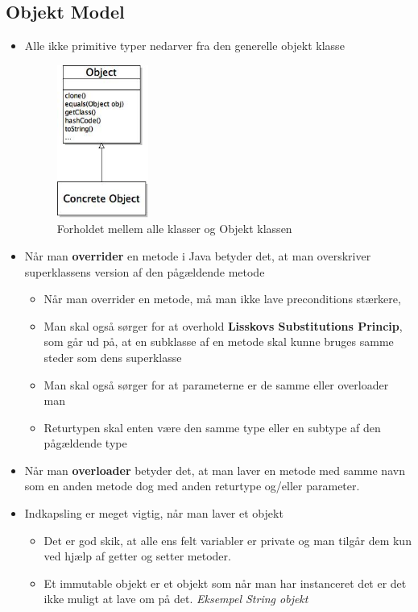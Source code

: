 \documentclass{article}
\begin{document}
\subsection{Objekt Model}
\begin{itemize}
	\item Alle ikke primitive typer nedarver fra den generelle objekt klasse
	\begin{figure}[ht!]
		\centering
		\includegraphics[width=30mm]{img/objectUML.jpeg}
		\caption{Forholdet mellem alle klasser og Objekt klassen  	\label{objectUML}}
	\end{figure}	
	\item Når man \textbf{overrider} en metode i Java betyder det, at man overskriver superklassens version af den pågældende metode
	\begin{itemize}
		\item Når man overrider en metode, må man ikke lave preconditions stærkere,
		\item Man skal også sørger for at overhold \textbf{Lisskovs Substitutions Princip}, som går ud på, at en subklasse af en metode skal kunne bruges samme steder som dens superklasse 
		\item Man skal også sørger for at parameterne er de samme eller overloader man
		\item Returtypen skal enten være den samme type eller en subtype af den pågældende type 
	\end{itemize}
	\item Når man \textbf{overloader} betyder det, at man laver en metode med samme navn som en anden metode dog med anden returtype og/eller parameter. 
	\item Indkapsling er meget vigtig, når man laver et objekt
	\begin{itemize}
		\item Det er god skik, at alle ens felt variabler er private og man tilgår dem kun ved hjælp af getter og setter metoder.
		\item Et immutable objekt er et objekt som når man har instanceret det er det ikke muligt at lave om på det. \textit{Eksempel String objekt} 
	\end{itemize} 
\end{itemize}
	
\end{document}

